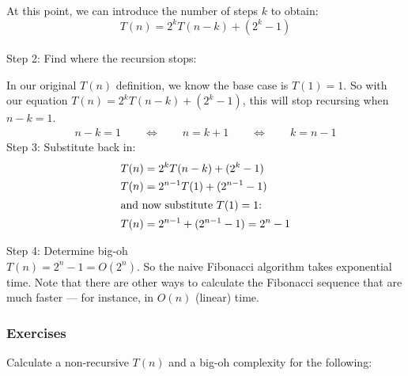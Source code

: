 \documentclass [letterpaper,12pt]{article}
\begin{document}
At this point, we can introduce the number of steps $k$ to obtain:
\[ T(n) = 2^k T(n-k)+(2^k-1) \]
\\
Step 2: Find where the recursion stops:

In our original $T(n)$ definition, we know the base case is $T(1)=1$.  So with our equation $T(n) = 2^k T(n-k)+(2^k-1)$,
this will stop recursing when $n-k=1$.
\begin{align*}
n-k = 1 \qquad \Leftrightarrow \qquad n=k+1 \qquad \Leftrightarrow \qquad k=n-1
\end{align*}
Step 3: Substitute back in:
\begin{align*} 
T(n) &= 2^k T(n-k)+(2^k-1) \\ 
T(n) &= 2^{n-1} T(1)+(2^{n-1}-1) \\ 
\intertext{and now substitute $T(1)=1$:}
T(n) &= 2^{n-1} +(2^{n-1}-1) = 2^n-1\\ 
\end{align*}

Step 4: Determine big-oh
\\

$T(n)  = 2^n-1 = O(2^n)$.  So the naive Fibonacci algorithm takes exponential time.  Note that there are other ways
to calculate the Fibonacci sequence that are much faster --- for instance, in $O(n)$ (linear) time. \\ 

\subsubsection*{Exercises}

Calculate a non-recursive $T(n)$ and a big-oh complexity for the following:
\end{document}
